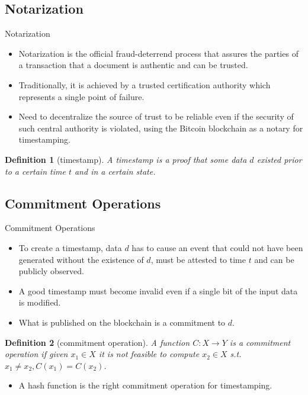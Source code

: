 \documentclass[usenames,dvipsnames]{beamer}
\newtheorem{mydef}{\alert{Definition}}[section]
\begin{document}
    \subsection{Notarization}
    \begin{frame}{Notarization}
    \begin{itemize}
        \item \alert{Notarization} is the official fraud-deterrend process that assures the parties of a transaction that a document is \alert{authentic} and can be \alert{trusted}.
        \item Traditionally, it is achieved by a trusted certification authority which represents a \alert{single point of failure}.
        \item Need to \alert{decentralize} the source of trust to be reliable even if the security of such central authority is violated, using the Bitcoin blockchain as a \alert{notary} for \alert{timestamping}.
        \end{itemize}
        \begin{mydef}[timestamp]
            A timestamp is a proof that some data $d$ existed prior to a certain time $t$ and in a certain state.
        \end{mydef}
    \end{frame}
    
    \subsection{Commitment Operations}
    \begin{frame}{Commitment Operations}
        \begin{itemize}
            \item To create a timestamp, data $d$ has to \alert{cause} an event that could not have been generated without the existence of $d$, must be \alert{attested} to time $t$ and can be \alert{publicly observed}.
            \item A \alert{good} timestamp must become \alert{invalid} even if a \alert{single bit} of the input data is modified.
            \item What is published on the blockchain is a \alert{commitment} to $d$.
            \end{itemize}
            \begin{mydef}[commitment operation]
            A function $C: X \rightarrow Y$ is a commitment operation if given $x_{1} \in X$ it is not feasible to compute $x_{2} \in X$ s.t. $x_{1} \neq x_{2}, C(x_{1}) = C(x_{2})$.
            \end{mydef}
            \begin{itemize}
                \item A \alert{hash function} is the right \alert{commitment operation} for timestamping.
            \end{itemize}
    \end{frame}
    
\end{document}
